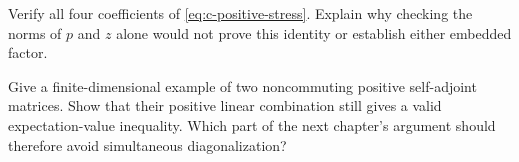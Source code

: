 \begin{exercise}\label{ex:c-factors-5}
Verify all four coefficients of \eqref{eq:c-positive-stress}.
Explain why checking the norms of $p$ and $z$ alone would not prove
this identity or establish either embedded factor.

\par\smallskip{}\par
\end{exercise}
\begin{exercise}\label{ex:c-factors-6}
Give a finite-dimensional example of two noncommuting positive
self-adjoint matrices. Show that their positive linear combination
still gives a valid expectation-value inequality. Which part of the
next chapter's argument should therefore avoid simultaneous
diagonalization?

\par\smallskip{}\par
\end{exercise}
